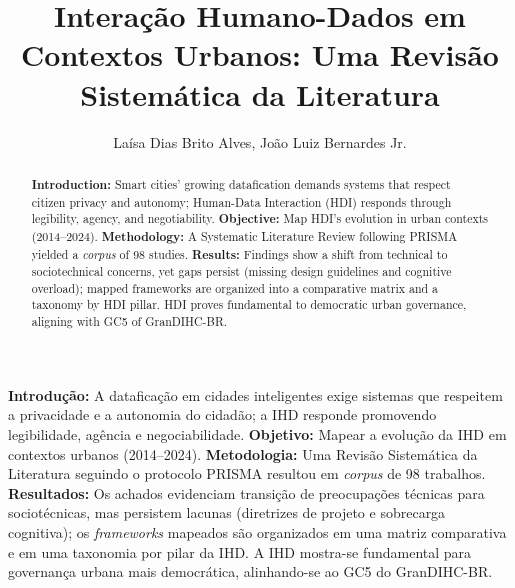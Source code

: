 \documentclass[12pt]{article}
\title{Interação Humano-Dados em Contextos Urbanos: Uma Revisão Sistemática da Literatura} %
\author{Laísa Dias Brito Alves, João Luiz Bernardes Jr.}
\begin{document}
 


\maketitle

\thispagestyle{plain}

\begin{abstract}{
\textbf{Introduction:} Smart cities' growing datafication demands systems that respect citizen privacy and autonomy; Human-Data Interaction (HDI) responds through legibility, agency, and negotiability. \textbf{Objective:} Map HDI's evolution in urban contexts (2014--2024). \textbf{Methodology:} A Systematic Literature Review following PRISMA yielded a \textit{corpus} of 98 studies. \textbf{Results:} Findings show a shift from technical to sociotechnical concerns, yet gaps persist (missing design guidelines and cognitive overload); mapped frameworks are organized into a comparative matrix and a taxonomy by HDI pillar. HDI proves fundamental to democratic urban governance, aligning with GC5 of GranDIHC-BR.}
\end{abstract}

     

\begin{resumo}{
  \textbf{Introdução:} A dataficação em cidades inteligentes exige sistemas que respeitem a privacidade e a autonomia do cidadão; a IHD responde promovendo legibilidade, agência e negociabilidade. \textbf{Objetivo:} Mapear a evolução da IHD em contextos urbanos (2014--2024). \textbf{Metodologia:} Uma Revisão Sistemática da Literatura seguindo o protocolo PRISMA resultou em \textit{corpus} de 98 trabalhos. \textbf{Resultados:} Os achados evidenciam transição de preocupações técnicas para sociotécnicas, mas persistem lacunas (diretrizes de projeto e sobrecarga cognitiva); os \textit{frameworks} mapeados são organizados em uma matriz comparativa e em uma taxonomia por pilar da IHD. A IHD mostra-se fundamental para governança urbana mais democrática, alinhando-se ao GC5 do GranDIHC-BR.}
\end{resumo}

\end{document}
